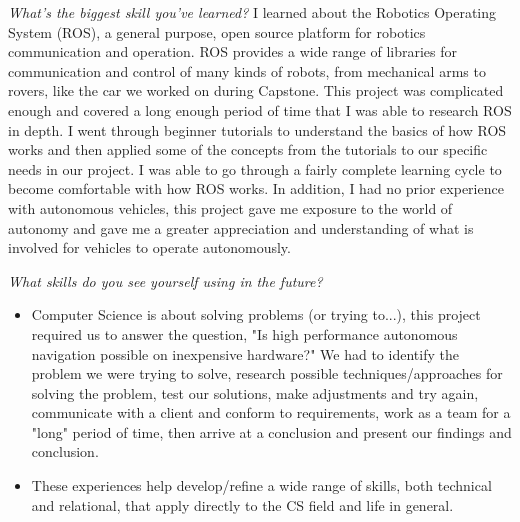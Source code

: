 \documentclass[compsoc,draftclsnofoot,onecolumn,10pt]{IEEEtran}
\begin{document}
\textit{What's the biggest skill you've learned?}
I learned about the Robotics Operating System (ROS), a general purpose, open source platform for robotics communication and operation. ROS provides a wide range of libraries for communication and control of many kinds of robots, from mechanical arms to rovers, like the car we worked on during Capstone. This project was complicated enough and covered a long enough period of time that I was able to research ROS in depth. I went through beginner tutorials to understand the basics of how ROS works and then applied some of the concepts from the tutorials to our specific needs in our project. I was able to go through a fairly complete learning cycle to become comfortable with how ROS works. In addition, I had no prior experience with autonomous vehicles, this project gave me exposure to the world of autonomy and gave me a greater appreciation and understanding of what is involved for vehicles to operate autonomously.

\textit{What skills do you see yourself using in the future?}
\begin{itemize}
    \item Computer Science is about solving problems (or trying to...), this project required us to answer the question, "Is high performance autonomous navigation possible on inexpensive hardware?" We had to identify the problem we were trying to solve, research possible techniques/approaches for solving the problem, test our solutions, make adjustments and try again, communicate with a client and conform to requirements, work as a team for a "long" period of time, then arrive at a conclusion and present our findings and conclusion.
    \item These experiences help develop/refine a wide range of skills, both technical and relational, that apply directly to the CS field and life in general.
\end{itemize}
\end{document}
